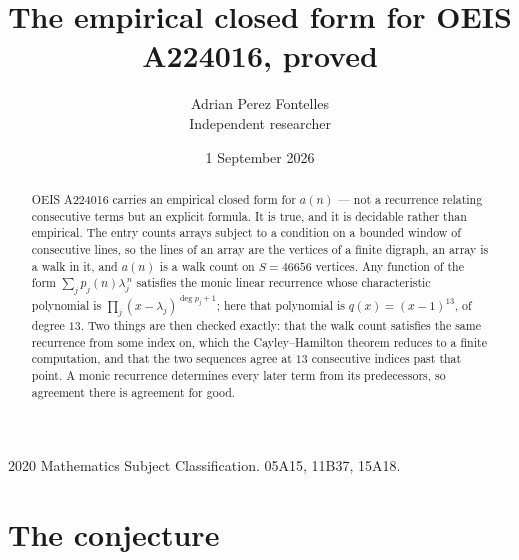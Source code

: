\documentclass[11pt,a4paper]{article}
\title{The empirical closed form for OEIS A224016, proved}
\author{Adrian Perez Fontelles\\ \small Independent researcher}
\date{1 September 2026}
\theoremstyle{plain}
\theoremstyle{definition}
\begin{document}
\maketitle

\begin{abstract}
OEIS A224016 carries an empirical closed form for $a(n)$ --- not a recurrence relating
consecutive terms but an explicit formula. It is true, and it is decidable rather than
empirical. The entry counts arrays subject to a condition on a bounded window of consecutive lines, so the lines of an array are the
vertices of a finite digraph, an array is a walk in it, and $a(n)$ is a walk count on
$S=46656$ vertices. Any function of the form $\sum_j p_j(n)\lambda_j^{\,n}$ satisfies the
monic linear recurrence whose characteristic polynomial is
$\prod_j(x-\lambda_j)^{\deg p_j+1}$; here that polynomial is $q(x)=(x-1)^{13}$, of degree
$13$. Two things are then checked exactly: that the walk count satisfies the same
recurrence from some index on, which the Cayley--Hamilton theorem reduces to a finite
computation, and that the two sequences agree at $13$ consecutive indices past that
point. A monic recurrence determines every later term from its predecessors, so agreement
there is agreement for good.
\end{abstract}

\noindent\small 2020 Mathematics Subject Classification. 05A15, 11B37, 15A18.\normalsize

\section{The conjecture}
\end{document}

